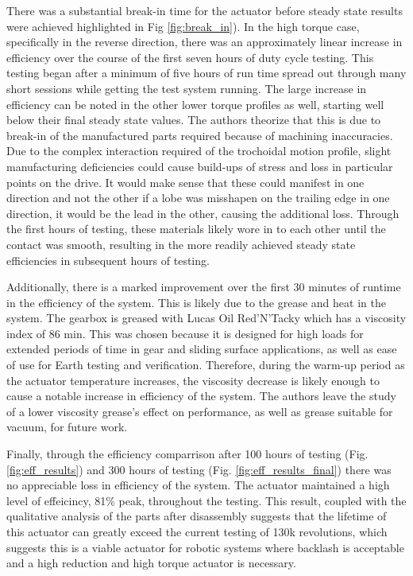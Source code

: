There was a substantial break-in time for the actuator before steady state results were achieved highlighted in Fig \ref{fig:break_in}).
In the high torque case, specifically in the reverse direction, there was an approximately linear increase in efficiency over the course of the first seven hours of duty cycle testing.
This testing began after a minimum of five hours of run time spread out through many short sessions while getting the test system running.
The large increase in efficiency can be noted in the other lower torque profiles as well, starting well below their final steady state values.
The authors theorize that this is due to break-in of the manufactured parts required because of machining inaccuracies.
Due to the complex interaction required of the trochoidal motion profile, slight manufacturing deficiencies could cause build-ups of stress and loss in particular points on the drive.
It would make sense that these could manifest in one direction and not the other if a lobe was misshapen on the trailing edge in one direction, it would be the lead in the other, causing the additional loss.
Through the first hours of testing, these materials likely wore in to each other until the contact was smooth, resulting in the more readily achieved steady state efficiencies in subsequent hours of testing.

Additionally, there is a marked improvement over the first 30 minutes of runtime in the efficiency of the system.
This is likely due to the grease and heat in the system.
The gearbox is greased with Lucas Oil Red'N'Tacky which has a viscosity index of 86 min.
This was chosen because it is designed for high loads for extended periods of time in gear and sliding surface applications, as well as ease of use for Earth testing and verification.
Therefore, during the warm-up period as the actuator temperature increases, the viscosity decrease is likely enough to cause a notable increase in efficiency of the system.
The authors leave the study of a lower viscosity grease's effect on performance, as well as grease suitable for vacuum, for future work.

Finally, through the efficiency comparrison after 100 hours of testing (Fig. \ref{fig:eff_results}) and 300 hours of testing (Fig. \ref{fig:eff_results_final}) there was no appreciable loss in efficiency of the system. The actuator maintained a high level of effeicincy, 81\% peak, throughout the testing. This result, coupled with the qualitative analysis of the parts after disassembly suggests that the lifetime of this actuator can greatly exceed the current testing of 130k revolutions, which suggests this is a viable actuator for robotic systems where backlash is acceptable and a high reduction and high torque actuator is necessary. 


